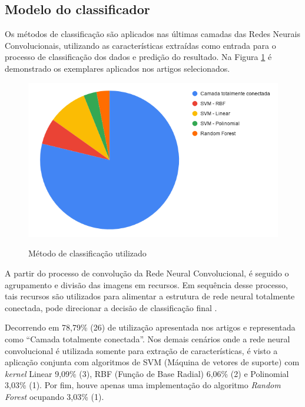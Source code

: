 \documentclass[
	12pt,				%
	oneside,			%
	a4paper,			%
	english,			%
	brazil				%
	]{abntex2ppgsi}
\begin{document}
\subsection{Modelo do classificador}
Os métodos de classificação são aplicados nas últimas camadas das Redes Neurais Convolucionais, utilizando as características extraídas como entrada para o processo de classificação dos dados e predição do resultado. Na Figura \ref{fig:grafico_classificador_vs_uso} é demonstrado os exemplares aplicados nos artigos selecionados.

\begin{figure}[H]
    \centering
    \caption{Método de classificação utilizado}
    \includegraphics[scale=.60]{imagens/revisao_sistematica/grafico_classificador_vs_uso.png}
    \label{fig:grafico_classificador_vs_uso}
\end{figure}

A partir do processo de convolução da Rede Neural Convolucional, é seguido o agrupamento e divisão das imagens em recursos. Em sequência desse processo, tais recursos são utilizados para alimentar a estrutura de rede neural totalmente conectada, pode direcionar a decisão de classificação final \cite{rauf2019visual}. 

Decorrendo em 78,79\% (26) de utilização apresentada nos artigos e representada como ``Camada totalmente conectada''. Nos demais cenários onde a rede neural convolucional é utilizada somente para extração de características, é visto a aplicação conjunta com algoritmos de SVM (Máquina de vetores de suporte) com \textit{kernel} Linear 9,09\% (3), RBF (Função de Base Radial) 6,06\% (2) e Polinomial 3,03\% (1). Por fim, houve apenas uma implementação do algoritmo \textit{Random Forest} ocupando 3,03\% (1).
\end{document}
